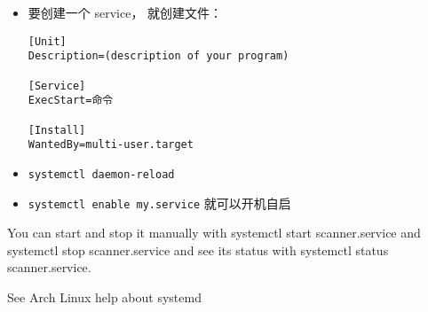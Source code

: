 
\begin{itemize}
\item 要创建一个 service， 就创建文件：
\begin{lstlisting}[language=none,caption=/etc/systemd/system/名字.service]
[Unit]
Description=(description of your program)

[Service]
ExecStart=命令

[Install]
WantedBy=multi-user.target
\end{lstlisting}
\item \verb|systemctl daemon-reload|
\item \verb|systemctl enable my.service| 就可以开机自启
\end{itemize}

You can start and stop it manually with systemctl start scanner.service and systemctl stop scanner.service and see its status with systemctl status scanner.service.

See Arch Linux help about systemd